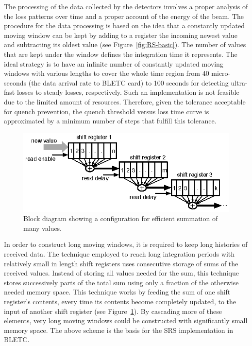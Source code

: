 \documentclass{llncs}
\begin{document}
The processing of the data collected by the detectors involves a proper analysis of the loss patterns over time and a proper account of the energy of the beam. The procedure for the data processing is based on the idea that a constantly updated moving window can be kept by adding to a register the incoming newest value and subtracting its oldest value (see Figure~\ref{fig:RS-basic}). The number of values that are kept under the window defines the integration time it represents.  The ideal strategy is to have an infinite number of constantly updated moving windows with various lengths to cover the whole time region from 40 micro-seconds (the data arrival rate to BLETC card)  to 100 seconds for detecting ultra-fast losses to steady losses, respectively. Such an implementation is not feasible due to the limited amount of resources. Therefore, given the tolerance acceptable for quench prevention, the quench threshold versus loss time curve is approximated by a minimum number of steps that fulfill this tolerance.

\begin{figure}[t]
  \centering \includegraphics{SRS-basic.eps}
   \caption{Block diagram showing a configuration for efficient summation of many values.}
  \label{fig:SRS-basic}
\end{figure}


In order to construct long moving windows, it is required to keep long histories of received data. The technique employed to reach long integration periods with relatively small in length shift registers uses consecutive storage of sums of the received values. Instead of storing all values needed for the sum, this technique stores successively parts of the total sum using only a fraction of the otherwise needed memory space. This technique works by feeding the sum of one shift register's contents, every time its contents become completely updated, to the input of another shift register (see Figure~\ref{fig:SRS-basic}). By cascading more of these elements, very long moving windows could be constructed with significantly small memory space. The above scheme is the basis for the SRS implementation in BLETC.
\end{document}
